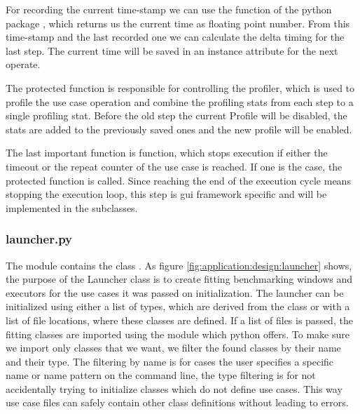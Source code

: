 

For recording the current time-stamp we can use the 
function of the python package , which returns us the
current time as floating point number. From this time-stamp and the last
recorded one we can calculate the delta timing for the last step. The current
time will be saved in an instance attribute for the next operate.



The protected function  is responsible for
controlling the profiler, which is used to profile the use case operation and
combine the profiling stats from each step to a single profiling stat. Before
the old step the current Profile will be disabled, the stats are added to the
previously saved ones and the new profile will be enabled.



The last important function is 
function, which stops execution if either the timeout or the repeat counter of
the use case is reached. If one is the case, the protected function
 is called. Since reaching the end of the
execution cycle means stopping the execution loop, this step is \gls{gui}
framework specific and will be implemented in the subclasses. 



\subsubsection*{launcher.py}

The module  contains the class
. As figure \ref{fig:application:design:launcher}
shows, the purpose of the Launcher class is to create fitting benchmarking
windows and executors for the use cases it was passed on initialization. The
launcher can be initialized using either a list of types, which are derived from
the  class or with a list of file locations, where
these classes are defined. If a list of files is passed, the fitting classes are
imported using the  module which python offers.
To make sure we import only classes that we want, we filter the found classes by
their name and their type. The filtering by name is for cases the user specifies
a specific name or name pattern on the command line, the type filtering is for
not accidentally trying to initialize classes which do not define use cases.
This way use case files can safely contain other class definitions without
leading to errors.

